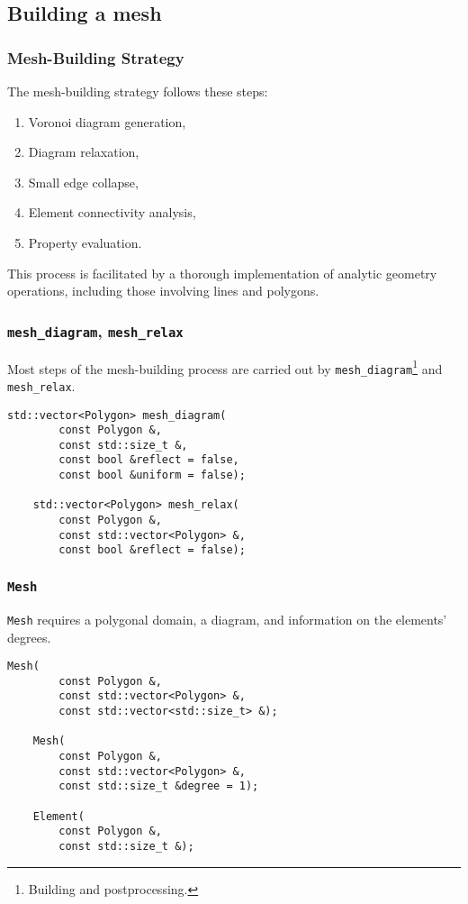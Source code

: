 \subsection{Building a mesh}

\begin{frame}
    \frametitle{Mesh-Building Strategy}

    The mesh-building strategy follows these steps:

    \begin{enumerate}
        \item Voronoi diagram generation,
        \item Diagram relaxation,
        \item Small edge collapse,
        \item Element connectivity analysis,
        \item Property evaluation.
    \end{enumerate}

    This process is facilitated by a thorough implementation of analytic geometry operations, including those involving lines and polygons.
\end{frame}

\begin{frame}[fragile]
    \frametitle{\lstinline{mesh_diagram}, \lstinline{mesh_relax}}

    Most steps of the mesh-building process are carried out by \lstinline{mesh_diagram}\footnote{Building and postprocessing.} and \lstinline{mesh_relax}.

    \begin{lstlisting}[style=cpp]
    std::vector<Polygon> mesh_diagram(
        const Polygon &, 
        const std::size_t &, 
        const bool &reflect = false, 
        const bool &uniform = false);

    std::vector<Polygon> mesh_relax(
        const Polygon &, 
        const std::vector<Polygon> &, 
        const bool &reflect = false);
    \end{lstlisting}

\end{frame}

\begin{frame}[fragile]
    \frametitle{\lstinline{Mesh}}

    \lstinline{Mesh} requires a polygonal domain, a diagram, and information on the elements' degrees.

    \begin{lstlisting}[style=cpp]
    Mesh(
        const Polygon &, 
        const std::vector<Polygon> &, 
        const std::vector<std::size_t> &);

    Mesh(
        const Polygon &, 
        const std::vector<Polygon> &, 
        const std::size_t &degree = 1);

    Element(
        const Polygon &, 
        const std::size_t &);
    \end{lstlisting}

\end{frame}

